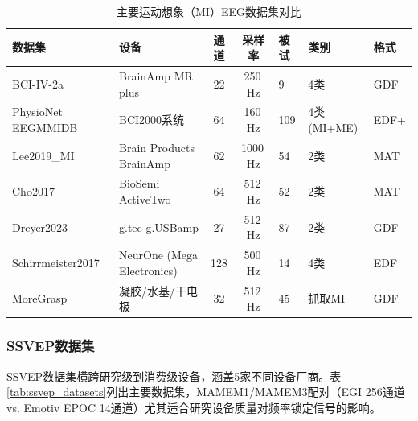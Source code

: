 \documentclass[12pt, a4paper]{article}
\begin{document}
\begin{table}[H]
\centering
\caption{主要运动想象（MI）EEG数据集对比}
\label{tab:mi_datasets}
\small
\begin{tabularx}{\textwidth}{p{3.0cm}p{2.8cm}ccp{0.6cm}XX}
\toprule
\textbf{数据集} & \textbf{设备} & \textbf{通道} & \textbf{采样率} & \textbf{被试} & \textbf{类别} & \textbf{格式} \\
\midrule
BCI-IV-2a & BrainAmp MR plus & 22 & 250\,Hz & 9 & 4类 & GDF \\
\addlinespace
PhysioNet EEGMMIDB \citep{PhysioNetMotor} & BCI2000系统 & 64 & 160\,Hz & 109 & 4类(MI+ME) & EDF+ \\
\addlinespace
Lee2019\_MI \citep{Lee2019OpenBMI} & Brain Products BrainAmp & 62 & 1000\,Hz & 54 & 2类 & MAT \\
\addlinespace
Cho2017 \citep{Cho2017MI} & BioSemi ActiveTwo & 64 & 512\,Hz & 52 & 2类 & MAT \\
\addlinespace
Dreyer2023 \citep{Dreyer2023MI} & g.tec g.USBamp & 27 & 512\,Hz & 87 & 2类 & GDF \\
\addlinespace
Schirrmeister2017 \citep{Schirrmeister2017EEGNet} & NeurOne (Mega Electronics) & 128 & 500\,Hz & 14 & 4类 & EDF \\
\addlinespace
MoreGrasp \citep{Schwarz2020MoreGrasp} & 凝胶/水基/干电极 & 32 & 512\,Hz & 45 & 抓取MI & GDF \\
\bottomrule
\end{tabularx}
\end{table}

\subsubsection{SSVEP数据集}

SSVEP数据集横跨研究级到消费级设备，涵盖5家不同设备厂商。表\ref{tab:ssvep_datasets}列出主要数据集，MAMEM1/MAMEM3配对（EGI 256通道 vs. Emotiv EPOC 14通道）尤其适合研究设备质量对频率锁定信号的影响。
\end{document}
